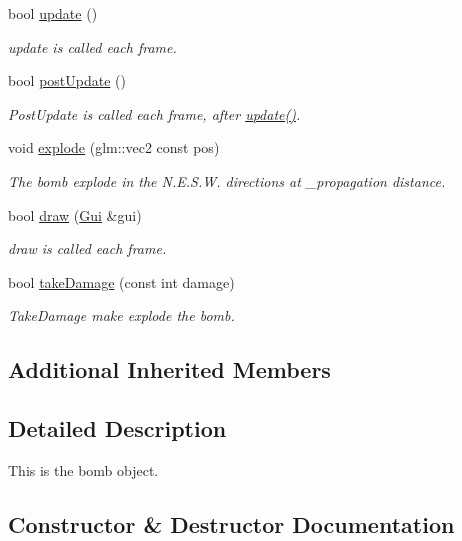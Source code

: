 \begin{DoxyCompactItemize}
bool \hyperlink{class_bomb_a9808d8efcc57b9ce7b0bd48d95875aad}{update} ()
\begin{DoxyCompactList}\small\item\em update is called each frame. \end{DoxyCompactList}\item 
bool \hyperlink{class_bomb_a443c5d40a92e67ef456c71369e8a111b}{post\+Update} ()
\begin{DoxyCompactList}\small\item\em Post\+Update is called each frame, after \hyperlink{class_bomb_a9808d8efcc57b9ce7b0bd48d95875aad}{update()}. \end{DoxyCompactList}\item 
void \hyperlink{class_bomb_a4d3105c3390626d385bdb5dfd0fa68ff}{explode} (glm\+::vec2 const pos)
\begin{DoxyCompactList}\small\item\em The bomb explode in the N.\+E.\+S.\+W. directions at \+\_\+propagation distance. \end{DoxyCompactList}\item 
bool \hyperlink{class_bomb_ae0ea4aa0ce14d353ad63c31cccc2a69d}{draw} (\hyperlink{class_gui}{Gui} \&gui)
\begin{DoxyCompactList}\small\item\em draw is called each frame. \end{DoxyCompactList}\item 
bool \hyperlink{class_bomb_ac51b260cdfef0cde903a88003994276e}{take\+Damage} (const int damage)
\begin{DoxyCompactList}\small\item\em Take\+Damage make explode the bomb. \end{DoxyCompactList}\end{DoxyCompactItemize}
\subsection*{Additional Inherited Members}


\subsection{Detailed Description}
This is the bomb object. 

\subsection{Constructor \& Destructor Documentation}
\mbox{\label{class_bomb_aa09b8879ab7aae611b05ad0e73e45696}} 
